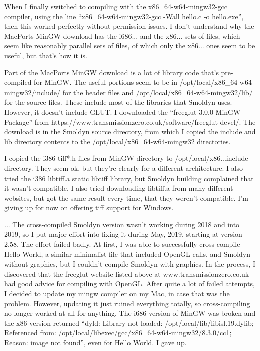 \documentclass {book}
\begin{document}
When I finally switched to compiling with the x86\_64-w64-mingw32-gcc compiler, using the line ``x86\_64-w64-mingw32-gcc -Wall hello.c -o hello.exe'', then this worked perfectly without permission issues. I don't understand why the MacPorts MinGW download has the i686... and the x86... sets of files, which seem like reasonably parallel sets of files, of which only the x86... ones seem to be useful, but that's how it is.

Part of the MacPorts MinGW download is a lot of library code that's pre-compiled for MinGW. The useful portions seem to be in /opt/local/x86\_64-w64-mingw32/include/ for the header files and /opt/local/x86\_64-w64-mingw32/lib/ for the source files. These include most of the libraries that Smoldyn uses. However, it doesn't include GLUT. I downloaded the ``freeglut 3.0.0 MinGW Package'' from https://www.transmissionzero.co.uk/software/freeglut-devel/. The download is in the Smoldyn source directory, from which I copied the include and lib directory contents to the /opt/local/x86\_64-w64-mingw32 directories.

I copied the i386 tiff*.h files from MinGW directory to /opt/local/x86...include directory. They seem ok, but they're clearly for a different architecture. I also tried the i386 libtiff.a static libtiff library, but Smoldyn building complained that it wasn't compatible. I also tried downloading libtiff.a from many different websites, but got the same result every time, that they weren't compatible. I'm giving up for now on offering tiff support for Windows.

... The cross-compiled Smoldyn version wasn't working during 2018 and into 2019, so I put major effort into fixing it during May, 2019, starting at version 2.58. The effort failed badly. At first, I was able to successfully cross-compile Hello World, a similar minimalist file that included OpenGL calls, and Smoldyn without graphics, but I couldn't compile Smoldyn with graphics. In the process, I discovered that the freeglut website listed above at www.transmissionzero.co.uk had good advice for compiling with OpenGL. After quite a lot of failed attempts, I decided to update my mingw compiler on my Mac, in case that was the problem. However, updating it just ruined everything totally, so cross-compiling no longer worked at all for anything. The i686 version of MinGW was broken and the x86 version returned ``dyld: Library not loaded: /opt/local/lib/libisl.19.dylib; Referenced from: /opt/local/libexec/gcc/x86\_64-w64-mingw32/8.3.0/cc1; Reason: image not found'', even for Hello World. I gave up.
\end{document}
